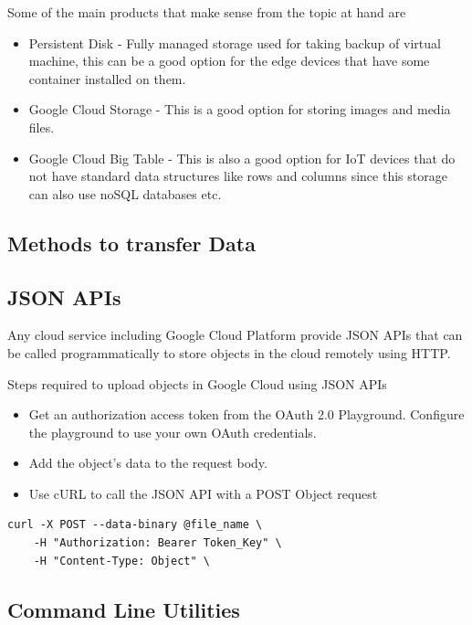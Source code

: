 Some of the main products that make sense from the topic at hand are

\begin{itemize}
\item Persistent Disk - Fully managed storage used for taking backup
  of virtual machine, this can be a good option for the edge devices
  that have some container installed on them.
\item Google Cloud Storage - This is a good option for storing images
  and media files.
\item Google Cloud Big Table - This is also a good option for IoT
  devices that do not have standard data structures like rows and
  columns since this storage can also use noSQL databases etc.
\end{itemize} 

\subsection{Methods to transfer Data}


\subsection{JSON APIs}

Any cloud service including Google Cloud Platform provide JSON APIs
that can be called programmatically to store objects in the cloud
remotely using HTTP.

Steps required to upload objects in Google Cloud using JSON APIs
\begin{itemize}
\item Get an authorization access token from the OAuth 2.0
  Playground. Configure the playground to use your own OAuth
  credentials.
\item Add the object's data to the request body.
\item Use cURL to call the JSON API with a POST Object request
\end{itemize} 

\begin{verbatim}
curl -X POST --data-binary @file_name \
    -H "Authorization: Bearer Token_Key" \
    -H "Content-Type: Object" \
\end{verbatim}

\subsection{Command Line Utilities}

